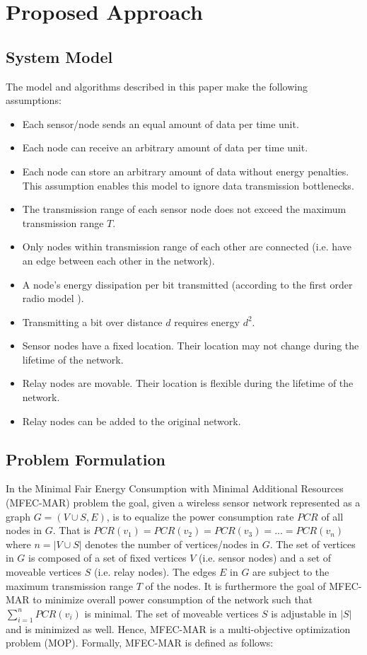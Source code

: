 \section{Proposed Approach}\label{approach}

\subsection{System Model}
The model and algorithms described in this paper make the following assumptions:

\begin{itemize}
\item Each sensor/node sends an equal amount of data per time unit.
\item Each node can receive an arbitrary amount of data per time unit.
\item Each node can store an arbitrary amount of data without energy penalties. This assumption enables this model to ignore data transmission bottlenecks.
\item The transmission range of each sensor node does not exceed the maximum transmission range $T$.
\item Only nodes within transmission range of each other are connected (i.e. have an edge between each other in the network).
\item A node's energy dissipation per bit transmitted (according to the first order radio model \cite{820485}).
\item Transmitting a bit over distance $d$ requires energy $d^2$.
\item Sensor nodes have a fixed location. Their location may not change during the lifetime of the network.
\item Relay nodes are movable. Their location is flexible during the lifetime of the network.
\item Relay nodes can be added to the original network.
\end{itemize}

\subsection{Problem Formulation}

In the Minimal Fair Energy Consumption with Minimal Additional Resources (MFEC-MAR) problem the goal, given a wireless sensor network represented as a graph $G=(V \cup S,E)$, is to equalize the power consumption rate $PCR$ of all nodes in $G$. That is $PCR(v_1)=PCR(v_2)=PCR(v_3)=...=PCR(v_n)$ where $n=|V \cup S|$ denotes the number of vertices/nodes in $G$. The set of vertices in $G$ is composed of a set of fixed vertices $V$ (i.e. sensor nodes) and a set of moveable vertices $S$ (i.e. relay nodes). The edges $E$ in $G$ are subject to the maximum transmission range $T$ of the nodes. It is furthermore the goal of MFEC-MAR to minimize overall power consumption of the network such that $\sum_{i=1}^{n} PCR(v_i)$ is minimal. The set of moveable vertices $S$ is adjustable in $|S|$ and is minimized as well. Hence, MFEC-MAR is a multi-objective optimization problem (MOP). Formally, MFEC-MAR is defined as follows:

